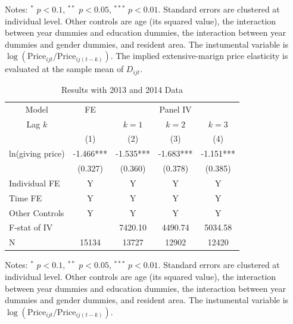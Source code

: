 \documentclass[ review  , 3p ]{elsarticle}
\begin{document}
\begin{table}
\begin{threeparttable}
\begin{tabular}[t]{lccc}
  \bottomrule
  \end{tabular}
  \begin{tablenotes}
  \item Notes: $^{*}$ $p < 0.1$, $^{**}$ $p < 0.05$, $^{***}$ $p < 0.01$. Standard errors are clustered at individual level. Other controls are age (its squared value), the interaction between year dummies and education dummies, the interaction between year dummies and gender dummies, and resident area. The instumental variable is $\log(\text{Price}_{ijt}/\text{Price}_{ij(t-k)})$. The implied extensive-marign price elasticity is evaluated at the sample mean of $D_{ijt}$.
  \end{tablenotes}
  \end{threeparttable}
  \end{table}

  \begin{table}

  \caption{\label{tab:kableShortEstimateElasticity}Results with 2013 and 2014 Data}
  \centering
  \begin{threeparttable}
  \begin{tabular}[t]{lcccc}
  \toprule
  \multicolumn{1}{c}{Model} & \multicolumn{1}{c}{FE} & \multicolumn{3}{c}{Panel IV} \\
  \cmidrule(l{3pt}r{3pt}){1-1} \cmidrule(l{3pt}r{3pt}){2-2} \cmidrule(l{3pt}r{3pt}){3-5}
  \multicolumn{1}{c}{Lag $k$} & \multicolumn{1}{c}{ } & \multicolumn{1}{c}{$k = 1$} & \multicolumn{1}{c}{$k = 2$} & \multicolumn{1}{c}{$k = 3$} \\
  \cmidrule(l{3pt}r{3pt}){1-1} \cmidrule(l{3pt}r{3pt}){3-3} \cmidrule(l{3pt}r{3pt}){4-4} \cmidrule(l{3pt}r{3pt}){5-5}
   & (1) & (2) & (3) & (4)\\
  \midrule
  ln(giving price) & -1.466*** & -1.535*** & -1.683*** & -1.151***\\
   & (0.327) & (0.360) & (0.378) & (0.385)\\
  Individual FE & Y & Y & Y & Y\\
  Time FE & Y & Y & Y & Y\\
  Other Controls & Y & Y & Y & Y\\
  F-stat of IV &  & 7420.10 & 4490.74 & 5034.58\\
  N & 15134 & 13727 & 12902 & 12420\\
  \bottomrule
  \end{tabular}
  \begin{tablenotes}
  \item Notes: $^{*}$ $p < 0.1$, $^{**}$ $p < 0.05$, $^{***}$ $p < 0.01$. Standard errors are clustered at individual level. Other controls are age (its squared value), the interaction between year dummies and education dummies, the interaction between year dummies and gender dummies, and resident area. The instumental variable is $\log(\text{Price}_{ijt}/\text{Price}_{ij(t-k)})$.
  \end{tablenotes}
  \end{threeparttable}
  \end{table}
\end{document}
